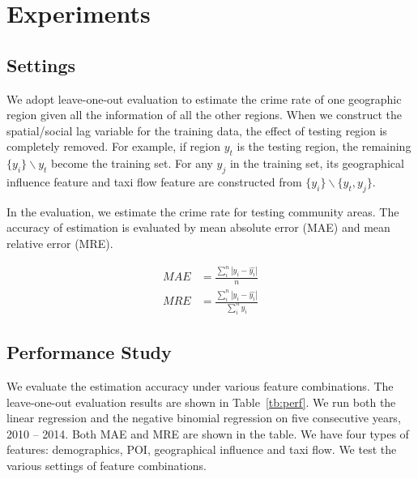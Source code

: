 \section{Experiments}
\label{ch2-sec:experiment}


\subsection{Settings}


We adopt leave-one-out evaluation to estimate the crime rate of one geographic region given all the information of all the other regions. When we construct the spatial/social lag variable for the training data, the effect of testing region is completely removed. For example, if region $y_t$ is the testing region, the remaining $\{y_i\} \backslash y_t$ become the training set. For any $y_j$ in the training set, its geographical influence feature and taxi flow feature are constructed from $\{y_i\} \backslash \{y_t, y_j\}$.


In the evaluation, we estimate the crime rate for testing community areas. The accuracy of estimation is evaluated by mean absolute error (MAE) and mean relative error (MRE).

\begin{align}
MAE & = \frac{\sum_i^n |y_i - \hat{y_i}| }{n} \\
MRE & = \frac{\sum_i^n |y_i - \hat{y_i}|} {\sum_i^n y_i }
\end{align}







\subsection{Performance Study}


We evaluate the estimation accuracy under various feature combinations. The leave-one-out evaluation results are shown in Table~\ref{tb:perf}.  We run both the linear regression and the negative binomial regression on five consecutive years, 2010 -- 2014. Both MAE and MRE are shown in the table. We have four types of features: demographics, POI, geographical influence and taxi flow. We test the various settings of feature combinations.





